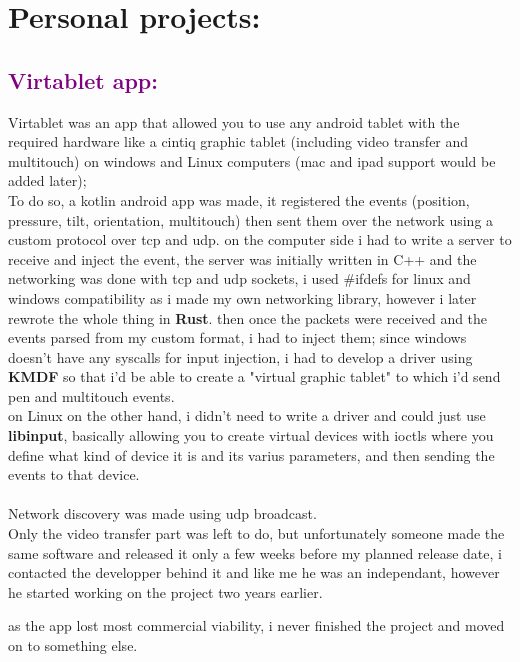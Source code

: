 \documentclass[a4paper,10pt]{article}
\begin{document}
\section*{Personal projects:}
\begin{spacing}{1}
	\subsection*{\textcolor{purple}{Virtablet app:}}
	Virtablet was an app that allowed you to use any android tablet with the required hardware like a cintiq graphic tablet (including video transfer and multitouch) on windows and Linux computers
	(mac and ipad support would be added later);\\

	To do so, a kotlin android app was made, it registered the events (position, pressure, tilt, orientation, multitouch) then sent them over the network using a custom protocol over tcp and udp.
	on the computer side i had to write a server to receive and inject the event, the server was initially written in C++ and the networking was done with tcp and udp sockets, i used \#ifdefs for linux and windows compatibility as i made my own networking library, however i later rewrote the whole thing in \textbf{Rust}.
	then once the packets were received and the events parsed from my custom format, i had to inject them; since windows doesn't have any syscalls for input injection, i had to develop a driver using
	\textbf{KMDF} so that i'd be able to create a "virtual graphic tablet" to which i'd send pen and multitouch events.\\

	on Linux on the other hand, i didn't need to write a driver and could just use \textbf{libinput}, basically allowing you to create virtual devices with ioctls where you define what kind of device it is and its varius parameters, and then sending the events to that device.
	\\
	\\
	Network discovery was made using udp broadcast.\\

	Only the video transfer part was left to do, but unfortunately someone made the same software and released it only a few weeks before my planned release date, i contacted the developper behind it
	and like me he was an independant, however he started working on the project two years earlier.

	\noindent as the app lost most commercial viability, i never finished the project and moved on to something else.


\end{spacing}
\end{document}
